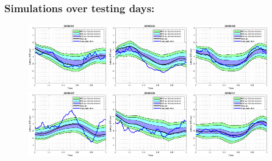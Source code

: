 \documentclass[aspectratio=169]{beamer}\usepackage[utf8]{inputenc}
\begin{document}

\begin{frame}\frametitle{Simulations over testing days:}

\begin{figure}[ht!]
\centering
\includegraphics[width=0.3\textwidth]{../../MATLAB_Files/Results/bands_testing_days/lamperti_optimal/1.eps}
\includegraphics[width=0.3\textwidth]{../../MATLAB_Files/Results/bands_testing_days/lamperti_optimal/2.eps}
\includegraphics[width=0.3\textwidth]{../../MATLAB_Files/Results/bands_testing_days/lamperti_optimal/3.eps}
\includegraphics[width=0.3\textwidth]{../../MATLAB_Files/Results/bands_testing_days/lamperti_optimal/4.eps}
\includegraphics[width=0.3\textwidth]{../../MATLAB_Files/Results/bands_testing_days/lamperti_optimal/5.eps}
\includegraphics[width=0.3\textwidth]{../../MATLAB_Files/Results/bands_testing_days/lamperti_optimal/6.eps}
\end{figure}

\end{frame}
\end{document}
